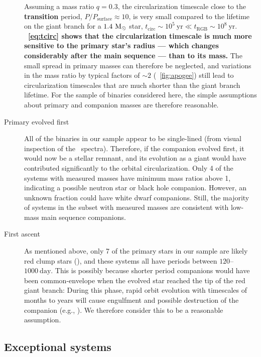 \documentclass[modern, letterpaper]{aastex62}
\newcommand{\apogee}{\project{\acronym{APOGEE}}}
\newcommand{\Psurf}{\ensuremath{P_\textrm{surface}}}
\renewcommand{\changes}[1]{\textbf{#1}}
\begin{document}
\begin{description}
    Assuming a mass ratio $q = 0.3$, the circularization timescale close to the
    \changes{transition} period, $P / \Psurf \approx 10$, is very small compared
    to the lifetime on the giant branch for a $1.4~\mathrm{M}_\odot$ star, $t_\textrm{circ}
    \sim 10^5~\textrm{yr} \ll t_\textrm{RGB} \sim 10^8~\textrm{yr}$.
    \changes{\eqname~\ref{eq:tcirc} shows that the circularization timescale is much more sensitive to the primary star's radius --- which changes considerably after the main sequence --- than to its mass.}
    The small spread in primary masses can therefore be neglected, and
    variations in the mass ratio by typical factors of $\sim 2$
    (\figurename~\ref{fig:apogee}) still lead to circularization timescales that
    are much shorter than the giant branch lifetime.
    For the sample of binaries considered here, the simple assumptions about
    primary and companion masses are therefore reasonable.
    \item[Primary evolved first] All of the binaries in our sample appear to be
    single-lined (from visual inspection of the \apogee\ spectra).
    Therefore, if the companion evolved first, it would now be a stellar
    remnant, and its evolution as a giant would have contributed significantly
    to the orbital circularization.
    Only 4 of the systems with measured masses have minimum mass ratios above 1,
    indicating a possible neutron star or black hole companion.
    However, an unknown fraction could have white dwarf companions.
    Still, the majority of systems in the subset with measured masses are
    consistent with low-mass main sequence companions.
    \item[First ascent] As mentioned above, only 7 of the primary stars in our
    sample are likely red clump stars (\citealt{Ting:2018}), and these systems
    all have periods between $120$--$1000~\textrm{day}$.
    This is possibly because shorter period companions would have been
    common-envelope when the evolved star reached the tip of the red giant
    branch: During this phase, rapid orbit evolution with timescales of months
    to years will cause engulfment and possible destruction of the companion
    (e.g., \citealt{Nordhaus:2010}).
    We therefore consider this to be a reasonable assumption.
\end{description}


\subsection{Exceptional systems}
\label{sec:exc}
\end{document}
